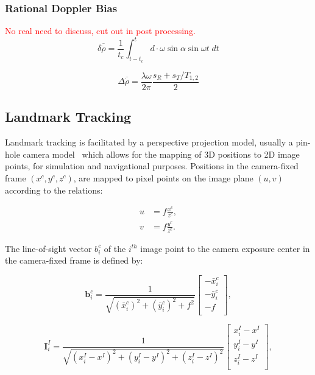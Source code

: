 \subsubsection{Rational Doppler Bias}
\textcolor{red}{No real need to discuss, cut out in post processing.}
\begin{equation}
    \delta\overline{\dot{\rho}} = \frac{1}{t_c}\int_{t-t_c}^{t}d\cdot{\omega\sin{\alpha}\sin{\omega{t}}\;dt}
\end{equation}

\begin{equation}
    \Delta{\overline{\dot{\rho}}} = \frac{\lambda\omega}{2\pi}\frac{s_R+s_T/T_{1,2}}{2}
\end{equation}



\subsection{Landmark Tracking}

Landmark tracking is facilitated by a perspective projection model, usually a
pin-hole camera model~\cite{Shuang2008} which allows for the mapping of 3D
positions to 2D image points, for simulation and navigational purposes.
Positions in the camera-fixed frame $(x^c, y^c, z^c)$, are mapped to pixel
points on the image plane $(u,v)$ according to the relations:

\begin{equation}
    \begin{aligned}
        u&=f\frac{x^c}{z^c},\\
        v&=f\frac{y^c}{z^c}.
    \end{aligned}
\end{equation}

The line-of-sight vector $b_i^c$ of the $i^{th}$ image point to the camera
exposure center in the camera-fixed frame is defined by:

\begin{equation}
    \mathbf{b}_i^c=\frac{1}{\sqrt{(\bar{x}_i^c)^2+(\bar{y}_i^c)^2+f^2}}
    \begin{bmatrix}
    -\bar{x}^c_i \\
    -\bar{y}^c_i \\
    -f \\
    \end{bmatrix},
\end{equation}

\begin{equation}
    \mathbf{I}_i^I=\frac{1}{\sqrt{(x^I_i - x^I)^2+(y^I_i - y^I)^2+(z^I_i - z^I)^2}}
    \begin{bmatrix}
    x^I_i - x^I \\
    y^I_i - y^I \\
    z^I_i - z^I \\
    \end{bmatrix},
\end{equation}

